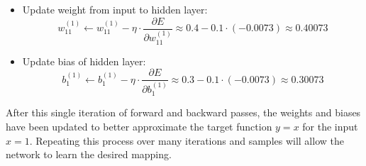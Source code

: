 \begin{examplebox}
\begin{itemize}
\begin{equation*}
        \end{equation*}
        \item Update weight from input to hidden layer:
        \begin{equation*}
            w_{11}^{(1)} \leftarrow w_{11}^{(1)} - \eta \cdot \dfrac{\partial E}{\partial w_{11}^{(1)}} \approx 0.4 - 0.1 \cdot (-0.0073) \approx 0.40073
        \end{equation*}
        \item Update bias of hidden layer:
        \begin{equation*}
            b_{1}^{(1)} \leftarrow b_{1}^{(1)} - \eta \cdot \dfrac{\partial E}{\partial b_{1}^{(1)}} \approx 0.3 - 0.1 \cdot (-0.0073) \approx 0.30073
        \end{equation*}
    \end{itemize}
    After this single iteration of forward and backward passes, the weights and biases have been updated to better approximate the target function $y = x$ for the input $x=1$. Repeating this process over many iterations and samples will allow the network to learn the desired mapping.
\end{examplebox}